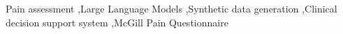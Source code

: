 \documentclass[preprint,12pt,authoryear]{elsarticle}
\newcommand{\system}{\small\textsc{giovi}\xspace}
\begin{document}
\begin{frontmatter}
\begin{abstract}
\end{abstract}



\begin{keyword}
Pain assessment \sep Large Language Models \sep Synthetic data generation \sep Clinical decision support system \sep McGill Pain Questionnaire
\end{keyword}

\end{frontmatter}
\end{document}
